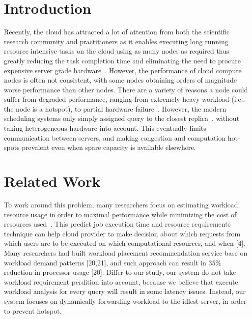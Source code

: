 \section{Introduction}

Recently, the cloud has attracted a lot of attention from both the scientific research community and practitioners as it enables executing long running resource intensive tasks on the cloud using as many nodes as required thus greatly reducing the task completion time and eliminating the need to procure expensive server grade hardware~\cite{Agrawal:2008:CRD:1462571.1462573}. However, the performance of cloud compute nodes is often not consistent, with some nodes obtaining orders of magnitude worse performance than other nodes. There are a variety of reasons a node could suffer from degraded performance, ranging from extremely heavy workload (i.e., the node is a hotspot), to partial hardware failure~\cite{citeulike:6656195}. However, the modern scheduling systems only simply assigned query to the closest replica~\cite{borthakur-07}, without taking heterogeneous hardware into account. This eventually limits communication between servers, and making congestion and computation hot-spots prevalent even when spare capacity is available elsewhere.

\section{Related Work}

To work around this problem, many researchers focus on estimating workload resource usage in order to maximal performance while minimizing the cost of resources used~\cite{citeulike:6656217,5452742,curino2011relational, MIT-Relational}. This predict job execution time and resource requirements technique can help cloud provider to make decision about which requests from which users are to be executed on which computational resources, and when [4]. Many researchers had built workload placement recommendation service base on workload demand patterns [20,21], and such approach can result in 35\% reduction in processor usage [20]. Differ to our study, our system do not take workload requirement perdition into account, because we believe that execute workload analysis for every query will result in some latency issues. Instead, our system focuses on dynamically forwarding workload to the idlest server, in order to prevent hotspot.
 
